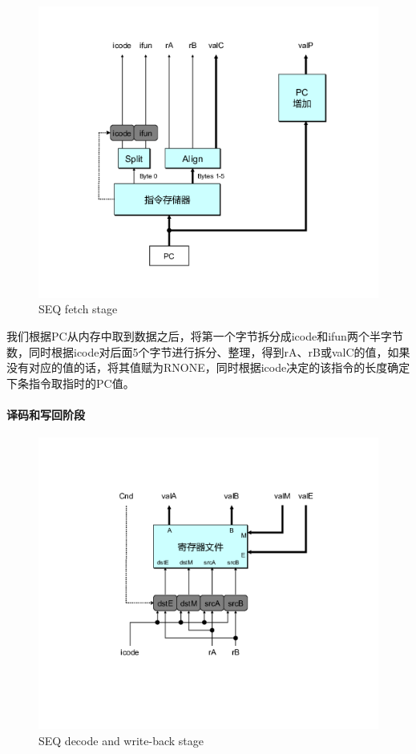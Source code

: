 \documentclass[12pt]{article}
\begin{document}
\begin{CJK*}{GB}{gbsn}
\begin{figure}[htbp]
\centering
\includegraphics{img/seq-fetch.png}
\caption{SEQ fetch stage}
\end{figure}

我们根据PC从内存中取到数据之后，将第一个字节拆分成icode和ifun两个半字节数，同时根据icode对后面5个字节进行拆分、整理，得到rA、rB或valC的值，如果没有对应的值的话，将其值赋为RNONE，同时根据icode决定的该指令的长度确定下条指令取指时的PC值。

\paragraph{译码和写回阶段}\label{ux8bd1ux7801ux548cux5199ux56deux9636ux6bb5}

\begin{figure}[htbp]
\centering
\includegraphics{img/seq-decode.png}
\caption{SEQ decode and write-back stage}
\end{figure}


\end{CJK*}
\end{document}
